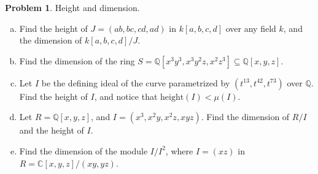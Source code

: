 \documentclass[11pt]{article}
\theoremstyle{definition}
\newtheorem{problem}{Problem}
\begin{document}
\begin{problem}
Height and dimension.
	\begin{enumerate}[a)]
		\item Find the height of $J = (ab,bc,cd,ad)$ in $k[a,b,c,d]$ over any field $k$, and the dimension of $k[a,b,c,d]/J$.
		\item Find the dimension of the ring $S = \mathbb{Q}[x^3y^3, x^3y^2z, x^2z^3] \subseteq \mathbb{Q}[x,y,z]$.
		\item Let $I$ be the defining ideal of the curve parametrized by $(t^{13},t^{42},t^{73})$ over $\mathbb{Q}$. Find the height of $I$, and notice that $\textrm{height}(I) < \mu(I)$.
		\item Let $R=\mathbb{Q}[x,y,z]$, and $I=(x^3, x^2y, x^2z, xyz)$. Find the dimension of $R/I$ and the height of $I$.
		\item Find the dimension of the module $I/I^2$, where $I = (xz)$ in $R = \mathbb{C}[x,y,z]/(xy,yz)$.	
	\end{enumerate}
\end{problem}
\end{document}

